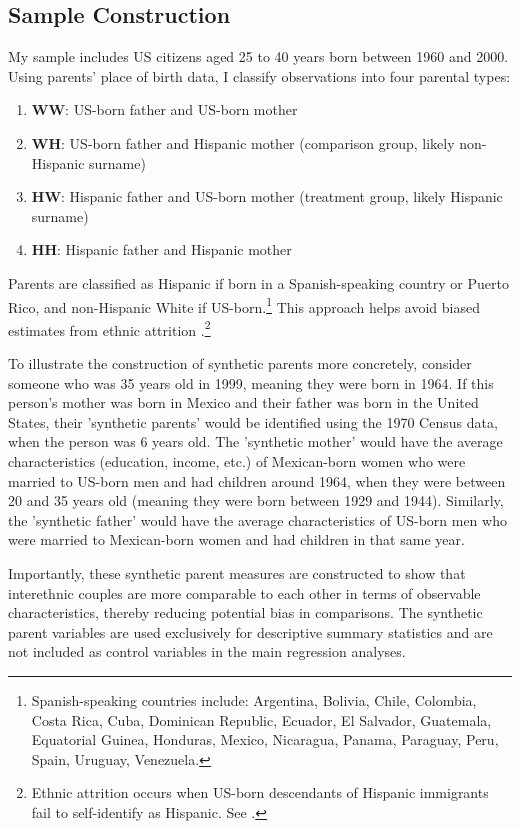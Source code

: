 \subsection{Sample Construction}

My sample includes US citizens aged 25 to 40 years born between 1960 and 2000. Using parents' place of birth data, I classify observations into four parental types:

\begin{enumerate}
\item \textbf{WW}: US-born father and US-born mother
\item \textbf{WH}: US-born father and Hispanic mother (comparison group, likely non-Hispanic surname)
\item \textbf{HW}: Hispanic father and US-born mother (treatment group, likely Hispanic surname)
\item \textbf{HH}: Hispanic father and Hispanic mother
\end{enumerate}

Parents are classified as Hispanic if born in a Spanish-speaking country or Puerto Rico, and non-Hispanic White if US-born.\footnote{Spanish-speaking countries include: Argentina, Bolivia, Chile, Colombia, Costa Rica, Cuba, Dominican Republic, Ecuador, El Salvador, Guatemala, Equatorial Guinea, Honduras, Mexico, Nicaragua, Panama, Paraguay, Peru, Spain, Uruguay, Venezuela.} This approach helps avoid biased estimates from ethnic attrition \autocite{hadah2024effect}.\footnote{Ethnic attrition occurs when US-born descendants of Hispanic immigrants fail to self-identify as Hispanic. See \textcite{antmanEthnicAttritionObserved2016,antmanEthnicAttritionAssimilation2020}.}

To illustrate the construction of synthetic parents more concretely, consider someone who was 35 years old in 1999, meaning they were born in 1964. If this person's mother was born in Mexico and their father was born in the United States, their 'synthetic parents' would be identified using the 1970 Census data, when the person was 6 years old. The 'synthetic mother' would have the average characteristics (education, income, etc.) of Mexican-born women who were married to US-born men and had children around 1964, when they were between 20 and 35 years old (meaning they were born between 1929 and 1944). Similarly, the 'synthetic father' would have the average characteristics of US-born men who were married to Mexican-born women and had children in that same year. 

Importantly, these synthetic parent measures are constructed to show that interethnic couples are more comparable to each other in terms of observable characteristics, thereby reducing potential bias in comparisons. The synthetic parent variables are used exclusively for descriptive summary statistics and are not included as control variables in the main regression analyses.

